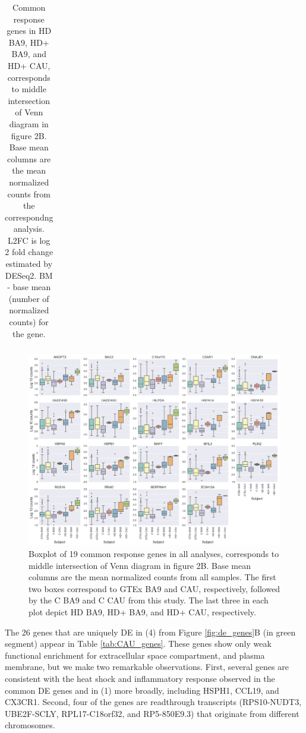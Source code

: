 \documentclass[fleqn,10pt,table]{wlscirep}
\begin{document}
\begin{table}[ht]
\begin{tabular}{|l|l|l|l|l|l|l|l|}
\end{tabular}
\caption{Common response genes in HD BA9, HD+ BA9, and HD+ CAU, corresponds to middle intersection of Venn diagram in figure 2B. Base mean columns are the mean normalized counts from the correspondng analysis. L2FC is log 2 fold change estimated by DESeq2. BM - base mean (number of normalized counts) for the gene. \label{tab:early_genes}}
\end{table}

\begin{figure}[ht]
\centering
\includegraphics[width=0.9\linewidth]{boxplots.png}
\caption{Boxplot of 19 common response genes in all analyses, corresponds to middle intersection of Venn diagram in figure 2B. Base mean columns are the mean normalized counts from all samples. The first two boxes correspond to GTEx BA9 and CAU, respectively, followed by the C BA9 and C CAU from this study. The last three in each plot depict HD BA9, HD+ BA9, and HD+ CAU, respectively.\label{fig:boxplot}}
\end{figure}

The 26 genes that are uniquely DE in (4) from Figure \ref{fig:de_genes}B (in green segment) appear in Table \ref{tab:CAU_genes}.
These genes show only weak functional enrichment for extracellular space compartment, and plasma membrane, but we make two remarkable observations.
First, several genes are consistent with the heat shock and inflammatory response observed in the common DE genes and in (1) more broadly, including HSPH1, CCL19, and CX3CR1.
Second, four of the genes are readthrough transcripts (RPS10-NUDT3, UBE2F-SCLY, RPL17-C18orf32, and RP5-850E9.3) that originate from different chromosomes.
\end{document}
